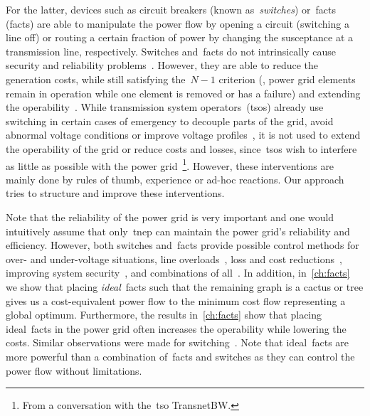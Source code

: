 For the latter, devices such as circuit breakers (known as~\emph{switches})
or~\gls{facts} (\acrlong{facts}) are able to manipulate the power flow by
opening a circuit (switching a line off) or routing a certain fraction of power
by changing the susceptance at a transmission line, respectively. Switches
and~\gls{facts} do not intrinsically cause security and reliability
problems~\parencite{LiG13}. However, they are able to reduce the generation
costs, while still satisfying the~$N-1$ criterion (\ie, power grid elements
remain in operation while one element is removed or has a failure)
% 
and extending the operability~\parencite{Bin01b,Lei15b,LiG13}. While
transmission system operators~(\gls{tso}{s}) already use switching in certain
cases of emergency to decouple parts of the grid, avoid abnormal voltage
conditions or improve voltage profiles~\parencite{Fis08}, it is not used to
extend the operability of the grid or reduce costs and losses,
since~\gls{tso}{s} wish to interfere as little as possible with the power
grid~\footnote{From a conversation with the~\gls{tso} TransnetBW.}. However,
these interventions are mainly done by rules of thumb, experience or ad-hoc
reactions. Our approach tries to structure and improve these interventions.

Note that the reliability of the power grid is very important and one would
intuitively assume that only~\gls{tnep} can maintain the power grid's
reliability and efficiency. However, both switches and~\gls{facts} provide
possible control methods for over- and under-voltage situations, line
overloads~\parencite{Gra06}, loss and cost reductions~\parencite{Sch90},
improving system security~\parencite{Sch88}, and combinations of
all~\parencite{Hed11}.
In addition, in~\cref{ch:facts} we show that placing \emph{ideal}~\gls{facts}
such that the remaining graph is a cactus or tree gives us a
% 
cost-equivalent power flow to the minimum cost flow representing a global
optimum. Furthermore, the results in~\cref{ch:facts} show that placing
ideal~\gls{facts} in the power grid often increases the operability while
lowering the costs. Similar observations were made for
switching~\parencite{Hedman2011}.
%
Note that ideal~\gls{facts} are more powerful than a combination
of~\gls{facts} and switches as they can control the power flow without
limitations.

